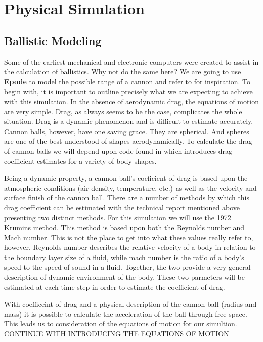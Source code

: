 \documentclass[letterpaper,10pt]{book}
\newcommand{\epode}[0]{\textbf{Epode}}
\begin{document}
      
  \chapter{Physical Simulation}
    \section{Ballistic Modeling}\label{sec:ballistic-modeling}
      Some of the earliest mechanical and electronic computers were created to assist in the calculation of ballistics.  Why not do the same here?  We are going to use \epode{} to model the possible range of a cannon and refer to \cite{wade2011going} for inspiration.  To begin with, it is important to outline precisely what we are expecting to achieve with this simulation.  In the absence of aerodynamic drag, the equations of motion are very simple.  Drag, as always seems to be the case, complicates the whole situation.  Drag is a dynamic phenomenon and is difficult to estimate accurately.  Cannon balls, however, have one saving grace.  They are spherical.  And spheres are one of the best understood of shapes aerodynamically.  To calculate the drag of cannon balls we will depend upon code found in \cite{yager2014calculating} which introduces drag coefficient estimates for a variety of body shapes.
      
      Being a dynamic property, a cannon ball's coeficient of drag is based upon the atmospheric conditions (air density, temperature, etc.) as well as the velocity and surface finish of the cannon ball.  There are a number of methods by which this drag coefficient can be estimated with the technical report mentioned above presenting two distinct methods.  For this simulation we will use the 1972 Krumins method.  This method is based upon both the Reynolds number and Mach number.  This is not the place to get into what these values really refer to, however, Reynolds number describes the relative velocity of a body in relation to the boundary layer size of a fluid, while mach number is the ratio of a body's speed to the speed of sound in a fluid.  Together, the two provide a very general description of dynamic environment of the body.  These two parmeters will be estimated at each time step in order to estimate the coefficient of drag.
	
      With coefficeint of drag and a physical description of the cannon ball (radius and mass) it is possible to calculate the acceleration of the ball through free space.  This leads us to consideration of the equations of motion for our simultion. CONTINUE WITH INTRODUCING THE EQUATIONS OF MOTION
      
\end{document}

